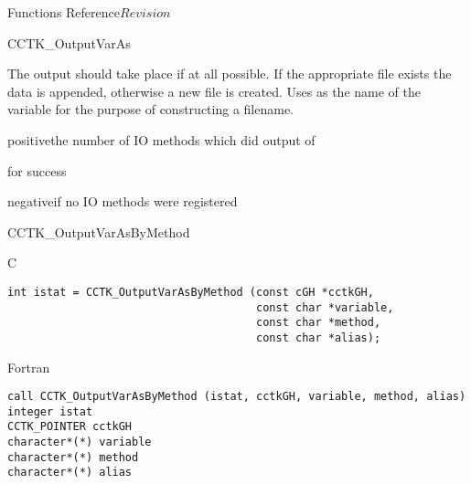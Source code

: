 \begin{cactuspart}{ Functions Reference}{}{$Revision$}
\begin{FunctionDescription}{CCTK\_OutputVarAs}
\begin{Discussion}
The output should take place if at all possible.
If the appropriate file exists the data is appended, otherwise a new
file is created. Uses  as the name of the variable for the purpose
of constructing a filename.
\end{Discussion}

\begin{ErrorSection}
\begin{Error}{positive}the number of IO methods which did output of \end{Error}
\begin{Error}{0}for success\end{Error}
\begin{Error}{negative}if no IO methods were registered\end{Error}
\end{ErrorSection}
\end{FunctionDescription}


\begin{FunctionDescription}{CCTK\_OutputVarAsByMethod}
\label{CCTK-OutputVarAsByMethod}

\begin{SynopsisSection}
\begin{Synopsis}{C}
\begin{verbatim}
int istat = CCTK_OutputVarAsByMethod (const cGH *cctkGH,
                                      const char *variable,
                                      const char *method,
                                      const char *alias);
\end{verbatim}
\end{Synopsis}
\begin{Synopsis}{Fortran}
\begin{verbatim}
call CCTK_OutputVarAsByMethod (istat, cctkGH, variable, method, alias)
integer istat
CCTK_POINTER cctkGH
character*(*) variable
character*(*) method
character*(*) alias
\end{verbatim}
\end{Synopsis}
\end{SynopsisSection}


\end{FunctionDescription}
\end{cactuspart}
